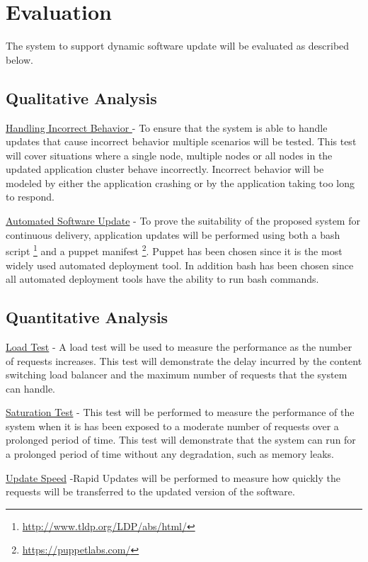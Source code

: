 \documentclass[a4paper,11pt,twoside]{article}
\begin{document}
\clearpage
\section{Evaluation}
The system to support dynamic software update will be evaluated as described below.

\subsection{Qualitative Analysis}
\noindent
\underline{Handling Incorrect Behavior } - To ensure that the system is able to handle updates that cause incorrect behavior multiple scenarios will be tested. This test will cover situations where a single node, multiple nodes or all nodes in the updated application cluster behave incorrectly. Incorrect behavior will be modeled by either the application crashing or by the application taking too long to respond.

\noindent
\underline{Automated Software Update} - To prove the suitability of the proposed system for continuous delivery, application updates will be performed using both a bash script \footnote{\url{http://www.tldp.org/LDP/abs/html/}} and a puppet manifest \footnote{\url{https://puppetlabs.com/}}. Puppet has been chosen since it is the most widely used automated deployment tool. In addition bash has been chosen since all automated deployment tools have the ability to run bash commands. 


\subsection{Quantitative Analysis}
\noindent
\underline{Load Test} - A load test will be used to measure the performance as the number of requests increases. This test will demonstrate the delay incurred by the content switching load balancer and the maximum number of requests that the system can handle.

\noindent
\underline{Saturation Test} - This test will be performed to measure the performance of the system when it is has been exposed to a moderate number of requests over a prolonged period of time. This test will demonstrate that the system can run for a prolonged period of time without any degradation, such as memory leaks.

\noindent
\underline{Update Speed} -Rapid Updates will be performed to measure how quickly the requests will be transferred to the updated version of the software. 
\end{document}
